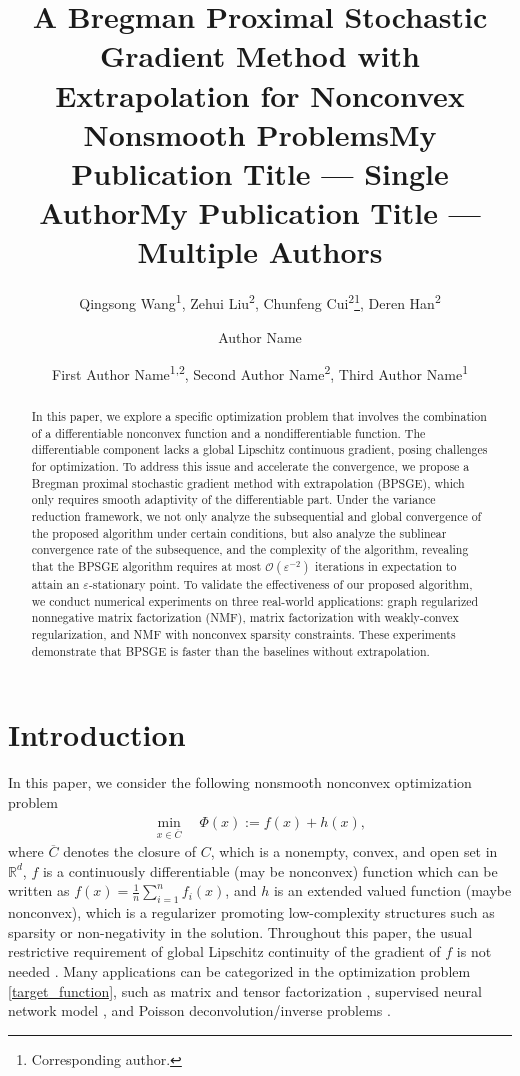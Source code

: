 \documentclass[letterpaper]{article} %
\title{A Bregman Proximal Stochastic Gradient Method with Extrapolation for Nonconvex Nonsmooth Problems}
\author{
	Qingsong Wang\textsuperscript{\rm 1},
	Zehui Liu\textsuperscript{\rm 2}, 
	Chunfeng Cui\textsuperscript{\rm 2}\thanks{Corresponding author.}, 
	Deren Han\textsuperscript{\rm 2}
}
\title{My Publication Title --- Single Author}
\author {
	Author Name
}
\title{My Publication Title --- Multiple Authors}
\author {
	First Author Name\textsuperscript{\rm 1,\rm 2},
	Second Author Name\textsuperscript{\rm 2},
	Third Author Name\textsuperscript{\rm 1}
}
\begin{document}
	
	\maketitle
	
	\begin{abstract}
		In this paper, we explore a specific optimization problem that involves the combination of a differentiable nonconvex function and a nondifferentiable function. The differentiable component lacks a global Lipschitz continuous gradient, posing challenges for optimization.  To address this issue and accelerate the convergence, we propose a Bregman proximal stochastic gradient method with extrapolation (BPSGE), which only requires smooth adaptivity of the differentiable part.  Under the variance reduction framework, we not only analyze the subsequential and global convergence of the proposed algorithm under certain conditions,  but also analyze the sublinear convergence rate of the subsequence, and the complexity of the algorithm, revealing that the BPSGE algorithm requires at most  $\mathcal{O}(\varepsilon^{-2})$ iterations in expectation to attain an $\varepsilon$-stationary point.  To validate the effectiveness of our proposed algorithm, we conduct numerical experiments on three real-world applications: graph regularized nonnegative matrix factorization (NMF), matrix factorization with weakly-convex regularization, and NMF with nonconvex sparsity constraints. These experiments demonstrate that BPSGE is faster than the baselines without extrapolation.
	\end{abstract}
	
	\section{Introduction}
	In this paper, we  consider the following nonsmooth nonconvex optimization problem
	\begin{eqnarray}
		\min_{x\in \overline{C}}\quad \Phi(x):=f(x)+h(x), \label{target_function}
	\end{eqnarray}
	where $\overline{C}$ denotes the closure of $C$, which is a nonempty, convex, and open set in $\mathbb{R}^{d}$, $f$ is a continuously differentiable  (may be nonconvex) function which can be written as $f(x)=\frac{1}{n}\sum_{i=1}^{n}f_{i}(x)$, and $h$ is an extended valued function (maybe nonconvex), which is a regularizer promoting low-complexity structures such as sparsity \cite{Donoho95, FanL01, Zhang10} or non-negativity \cite{LeeS99, HeXZZC11} in the solution. Throughout this paper, the usual restrictive requirement of global Lipschitz continuity of the gradient of $f$ is not needed  \cite{Lan2020First, Gillis20}. Many applications can be categorized in the optimization problem \eqref{target_function}, such as matrix and tensor factorization \cite{ComonGLM08, KoldaB09, CheW20}, supervised neural network model \cite{HasannasabHNPSS2020},  and Poisson deconvolution/inverse problems \cite{BolteSTV18First}. 
	
\end{document}
